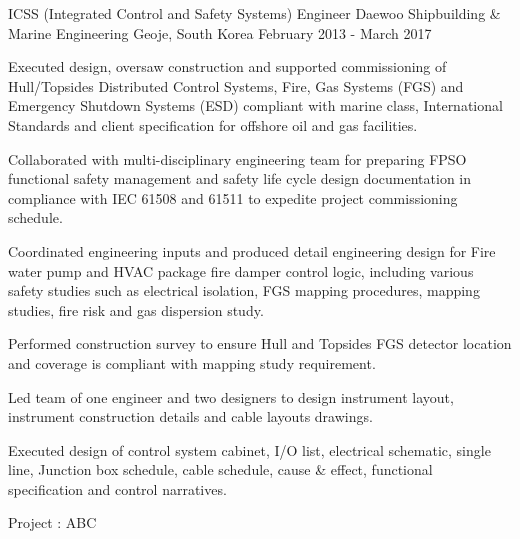\begin{cventries}
	\cventry
	{ICSS (Integrated Control and Safety Systems) Engineer} %
	{Daewoo Shipbuilding \& Marine Engineering} %
	{Geoje, South Korea} %
	{February 2013 - March 2017} %
	{ %
		\begin{cvitems}
			\item {Executed design, oversaw construction and supported commissioning of Hull/Topsides Distributed Control Systems, Fire, Gas Systems (FGS) and Emergency Shutdown Systems (ESD) compliant with marine class, International Standards and client specification for offshore oil and gas facilities.}
			\item {Collaborated with multi-disciplinary engineering team for preparing FPSO functional safety management and safety life cycle design documentation in compliance with IEC 61508 and 61511 to expedite project commissioning schedule.}
			\item {Coordinated engineering inputs and produced detail engineering design for Fire water pump and HVAC package fire damper control logic, including various safety studies such as electrical isolation, FGS mapping procedures, mapping studies, fire risk and gas dispersion study.}
			\item {Performed construction survey to ensure Hull and Topsides FGS detector location and coverage is compliant with mapping study requirement.}
			\item {Led team of one engineer and two designers to design instrument layout, instrument construction details and cable layouts drawings.}
			\item {Executed design of control system cabinet, I/O list, electrical schematic, single line, Junction box schedule, cable schedule, cause \& effect, functional specification and control narratives.}		
		\end{cvitems}
	}
	\cvprojentry
	{Project : }
	{ABC}
\end{cventries}

